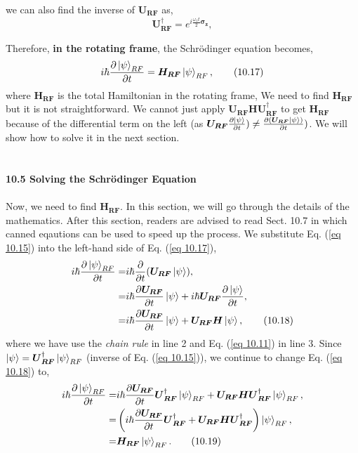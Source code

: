 \documentclass{article}
\begin{document}
we can also find the inverse of $\boldsymbol{U_{RF}}$ as,
\begin{equation}\label{eq 10.16}
    \boldsymbol{U}^\dagger_{\boldsymbol{RF}}=e^{i\frac{\omega_1t}{2}\boldsymbol{\sigma_z}},\tag{10.16}
\end{equation}

Therefore, \textbf{in the rotating frame}, the Schr\"{o}dinger equation becomes,
\begin{equation}\label{eq 10.17}
    i\hbar\frac{\partial \ket{\psi}_{RF}}{\partial t}=\boldsymbol{H_{RF}}\ket{\psi}_{RF},\tag{10.17}
\end{equation}
where $\boldsymbol{H_{RF}}$ is the total Hamiltonian in the rotating frame, We need to find 
$\boldsymbol{H_{RF}}$ but it is not straightforward. We cannot just apply $\boldsymbol{U_{RF}H}\boldsymbol{U}^\dagger_{\boldsymbol{RF}}$
to get $\boldsymbol{H_{RF}}$ because of the differential term on the left (as
$\boldsymbol{U_{RF}}\frac{\partial \ket{\psi}}{\partial t})\neq \frac{\partial(\boldsymbol{U_{RF}}\ket{\psi})}{\partial t})$.
We will show how to solve it in the next section.\\\\\\
\textbf{\large 10.5 Solving the Schr\"{o}dinger Equation}\\\\
Now, we need to find $\boldsymbol{H_{RF}}$. In this section, we will go through the details of the mathematics. After this section, readers are advised to read Sect. 10.7 in which 
canned eqautions can be used to speed up the process. We substitute Eq. (\ref{eq 10.15})
into the left-hand side of Eq. (\ref{eq 10.17}),
\begin{align*}\label{eq 10.18}
    i\hbar\frac{\partial \ket{\psi}_{RF}}{\partial t}=&i\hbar\frac{\partial}{\partial t}(\boldsymbol{U_{RF}}\ket{\psi}),\\
    =&i\hbar\frac{\partial\boldsymbol{U_{RF}}}{\partial t}\ket{\psi}+i\hbar\boldsymbol{U_{RF}}\frac{\partial \ket{\psi}}{\partial t},\\
    =&i\hbar\frac{\partial\boldsymbol{U_{RF}}}{\partial t}\ket{\psi}+\boldsymbol{U_{RF}H}\ket{\psi}, \tag{10.18}
\end{align*}
where we have use the \textit{chain rule} in line 2 and Eq. (\ref{eq 10.11}) in line 3. Since $\ket{\psi}=\boldsymbol{U}^\dagger_{\boldsymbol{RF}}\ket{\psi}_{RF}$
(inverse of Eq. (\ref{eq 10.15})), we continue to change Eq. (\ref{eq 10.18}) to,
\begin{align*}\label{eq 10.19}
    i\hbar\frac{\partial \ket{\psi}_{RF}}{\partial t}=&i\hbar\frac{\partial \boldsymbol{U_{RF}}}{\partial t}\boldsymbol{U}^\dagger_{\boldsymbol{RF}}\ket{\psi}_{RF}
    +\boldsymbol{U_{RF}H}\boldsymbol{U}^\dagger_{\boldsymbol{RF}}\ket{\psi}_{RF},\\
    =&\left(i\hbar\frac{\partial \boldsymbol{U_{RF}}}{\partial t}\boldsymbol{U}^\dagger_{\boldsymbol{RF}}+\boldsymbol{U_{RF}H}\boldsymbol{U}^\dagger_{\boldsymbol{RF}}\right)\ket{\psi}_{RF},\\
    =&\boldsymbol{H_{RF}}\ket{\psi}_{RF}. \tag{10.19}
\end{align*}
\end{document}

